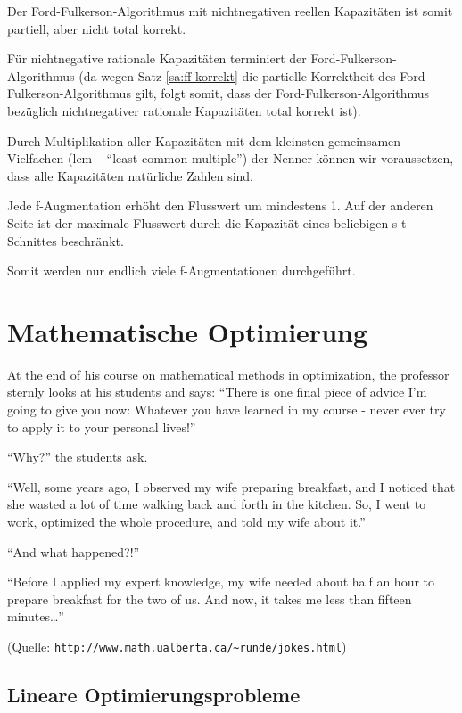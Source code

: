 \documentclass[10pt]{scrbook}
\begin{document}
\begin{Bem}
Der Ford-Fulkerson-Algorithmus mit nichtnegativen reellen Kapazitäten ist somit partiell, aber nicht total korrekt.
\end{Bem}

\begin{Le}
Für nichtnegative rationale Kapazitäten terminiert der Ford-Fulkerson-Algorithmus (da wegen Satz \ref{sa:ff-korrekt} die partielle Korrektheit des Ford-Fulkerson-Algorithmus gilt, folgt somit, dass der Ford-Fulkerson-Algorithmus bezüglich nichtnegativer rationale Kapazitäten total korrekt ist).
\end{Le}
\begin{bew}
Durch Multiplikation aller Kapazitäten mit dem kleinsten gemeinsamen Vielfachen (lcm -- "`least common multiple"') der Nenner können wir voraussetzen, dass alle Kapazitäten natürliche Zahlen sind.

Jede f-Augmentation erhöht den Flusswert um mindestens 1. Auf der anderen Seite ist der maximale Flusswert durch die Kapazität eines beliebigen s-t-Schnittes beschränkt.

Somit werden nur endlich viele f-Augmentationen durchgeführt.
\end{bew}

\chapter{Mathematische Optimierung}

At the end of his course on mathematical methods in optimization, the professor sternly looks at his students and says: "`There is one final piece of advice I'm going to give you now: Whatever you have learned in my course - never ever try to apply it to your personal lives!"'

"`Why?"' the students ask.

"`Well, some years ago, I observed my wife preparing breakfast, and I noticed that she wasted a lot of time walking back and forth in the kitchen. So, I went to work, optimized the whole procedure, and told my wife about it."'

"`And what happened?!"'

"`Before I applied my expert knowledge, my wife needed about half an hour to prepare breakfast for the two of us. And now, it takes me less than fifteen minutes\ldots"'

(Quelle: \verb|http://www.math.ualberta.ca/~runde/jokes.html|)

\section{Lineare Optimierungsprobleme}
\end{document}
